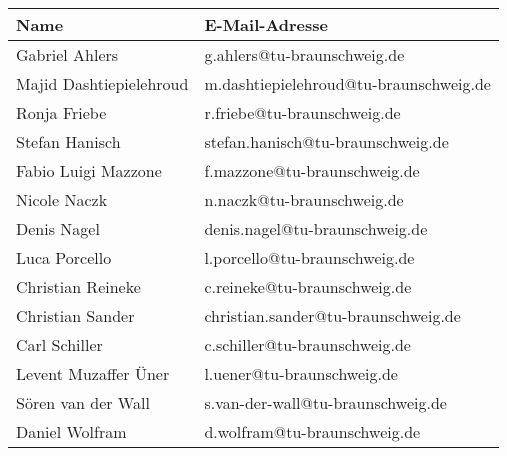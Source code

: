 \begin{tabular}{l<{\hspace{20mm}} l<{\hspace{21mm}}}\\

  Name                   &   E-Mail-Adresse\\      %

  \hline                    %

 
 Gabriel Ahlers &  g.ahlers@tu-braunschweig.de\\
 Majid Dashtiepielehroud &  m.dashtiepielehroud@tu-braunschweig.de\\
 Ronja Friebe &  r.friebe@tu-braunschweig.de\\  
 Stefan Hanisch &  stefan.hanisch@tu-braunschweig.de\\  
 Fabio Luigi Mazzone & f.mazzone@tu-braunschweig.de\\  
 Nicole Naczk &  n.naczk@tu-braunschweig.de\\  
 Denis Nagel &  denis.nagel@tu-braunschweig.de\\  
 Luca Porcello &  l.porcello@tu-braunschweig.de\\  
 Christian Reineke &  c.reineke@tu-braunschweig.de\\  
 Christian Sander &  christian.sander@tu-braunschweig.de\\  
 Carl Schiller &  c.schiller@tu-braunschweig.de\\  
 Levent Muzaffer \"Uner &  l.uener@tu-braunschweig.de\\  
 S\"oren van der Wall &  s.van-der-wall@tu-braunschweig.de\\  
 Daniel Wolfram &  d.wolfram@tu-braunschweig.de\\  


\end{tabular}

